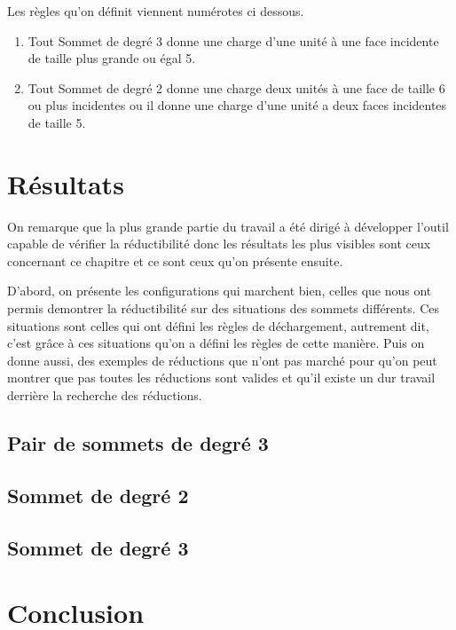 \documentclass[10pt,a4paper]{article}
\begin{document}
Les règles qu'on définit viennent numérotes ci dessous.

\begin{enumerate}
\item Tout Sommet de degré 3 donne une charge d'une unité à une face incidente de taille plus grande ou égal 5.
\item Tout Sommet de degré 2 donne une charge deux unités à une face de taille 6 ou plus incidentes ou il donne une charge d'une unité a deux faces incidentes de taille 5.
\end{enumerate} 


\section{Résultats}
On remarque que la plus grande partie du travail a été dirigé à développer l'outil capable de vérifier la réductibilité donc les résultats les plus visibles sont ceux concernant ce chapitre et ce sont ceux qu'on présente ensuite.

D'abord, on présente les configurations qui marchent bien, celles que nous ont permis demontrer la réductibilité sur des situations des sommets différents. Ces situations sont celles qui ont défini les règles de déchargement, autrement dit, c'est grâce à ces situations qu'on a défini les règles de cette manière. Puis on donne aussi, des exemples de réductions que n'ont pas marché pour qu'on peut montrer que pas toutes les réductions sont valides et qu'il existe un dur travail derrière la recherche des réductions. 
\subsection{Pair de sommets de degré 3}
\subsection{Sommet de degré 2}
\subsection{Sommet de degré 3}
\section{Conclusion}
\end{document}
